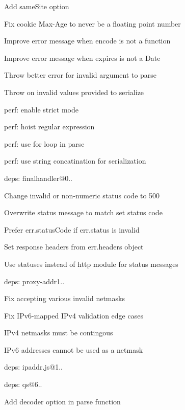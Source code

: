 \begin{DoxyItemize}
\begin{DoxyItemize}
\item Add {\ttfamily same\+Site} option
\item Fix cookie {\ttfamily Max-\/\+Age} to never be a floating point number
\item Improve error message when {\ttfamily encode} is not a function
\item Improve error message when {\ttfamily expires} is not a {\ttfamily Date}
\item Throw better error for invalid argument to parse
\item Throw on invalid values provided to {\ttfamily serialize}
\item perf\+: enable strict mode
\item perf\+: hoist regular expression
\item perf\+: use for loop in parse
\item perf\+: use string concatination for serialization
\end{DoxyItemize}
\item deps\+: finalhandler@0..
\begin{DoxyItemize}
\item Change invalid or non-\/numeric status code to 500
\item Overwrite status message to match set status code
\item Prefer {\ttfamily err.\+status\+Code} if {\ttfamily err.\+status} is invalid
\item Set response headers from {\ttfamily err.\+headers} object
\item Use {\ttfamily statuses} instead of {\ttfamily http} module for status messages
\end{DoxyItemize}
\item deps\+: proxy-\/addr1..
\begin{DoxyItemize}
\item Fix accepting various invalid netmasks
\item Fix I\+Pv6-\/mapped I\+Pv4 validation edge cases
\item I\+Pv4 netmasks must be contingous
\item I\+Pv6 addresses cannot be used as a netmask
\item deps\+: ipaddr.\+js@1..
\end{DoxyItemize}
\item deps\+: qs@6..
\begin{DoxyItemize}
\item Add {\ttfamily decoder} option in {\ttfamily parse} function

\end{DoxyItemize}
\end{DoxyItemize}

